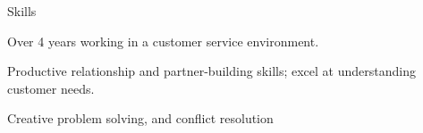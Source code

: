\documentclass{resume} %
\begin{document}

\begin{rSection}{Skills}
    \begin{description}
    \item Over 4 years working in a customer service environment.
    \item Productive relationship and partner-building skills; excel at understanding customer needs.
    \item Creative problem solving, and conflict resolution
    \end{description}
\end{rSection}





\end{document}

